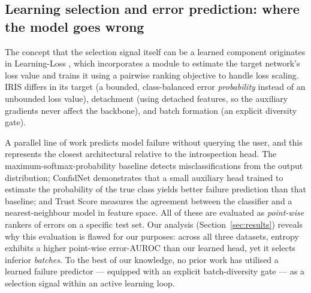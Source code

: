 \documentclass[a4paper,fleqn,longmktitle]{cas-sc}
\newcommand{\method}{IRIS}
\begin{document}
\subsection{Learning selection and error prediction: where the model goes wrong}
The concept that the selection signal itself can be a learned component
originates in Learning-Loss \citep{yoo2019}, which incorporates a
module to estimate the target network's loss value and trains it using
a pairwise ranking objective to handle loss scaling. \method{} differs
in its target (a bounded, class-balanced error \emph{probability}
instead of an unbounded loss value), detachment (using detached
features, so the auxiliary gradients never affect the backbone), and
batch formation (an explicit diversity gate).

A parallel line of work predicts model failure without querying the
user, and this represents the closest architectural relative to the
introspection head. The maximum-softmax-probability baseline
\citep{hendrycks2017} detects misclassifications from the output
distribution; ConfidNet \citep{corbiere2019} demonstrates that a small
auxiliary head trained to estimate the probability of the true class
yields better failure prediction than that baseline; and Trust Score
\citep{jiang2018} measures the agreement between the classifier and a
nearest-neighbour model in feature space. All of these are evaluated as
\emph{point-wise} rankers of errors on a specific test set. Our
analysis (Section~\ref{sec:results}) reveals why this evaluation is
flawed for our purposes: across all three datasets, entropy exhibits a
higher point-wise error-AUROC than our learned head, yet it selects
inferior \emph{batches}. To the best of our knowledge, no prior work
has utilised a learned failure predictor --- equipped with an explicit
batch-diversity gate --- as a selection signal within an active
learning loop.
\end{document}
